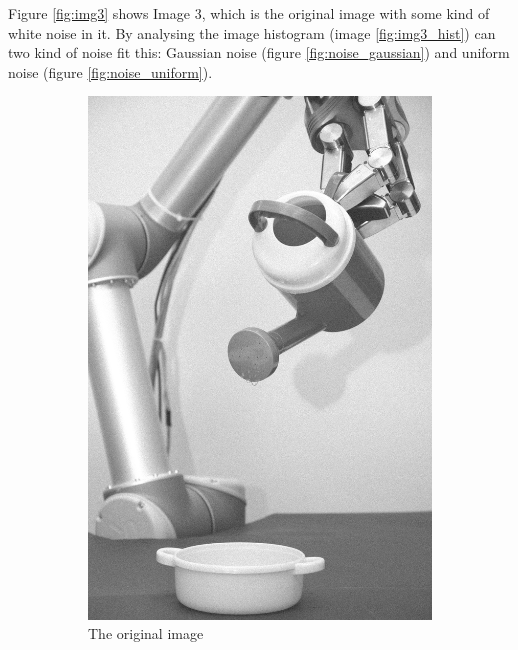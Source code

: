 Figure \ref{fig:img3} shows Image 3, which is the original image with some kind of white noise in it. By analysing the image histogram (image \ref{fig:img3_hist}) can two kind of noise fit this: Gaussian noise (figure \ref{fig:noise_gaussian}) and uniform noise (figure \ref{fig:noise_uniform}).

\begin{figure}[H]
    \centering
    \begin{subfigure}[b]{0.25\textwidth}
        \includegraphics[width=\textwidth]{img3/src.png}
        \caption{The original image}
        \label{fig:img3_src}
    \end{subfigure}
    \begin{subfigure}[b]{0.485\textwidth}

\end{subfigure}
\end{figure}
